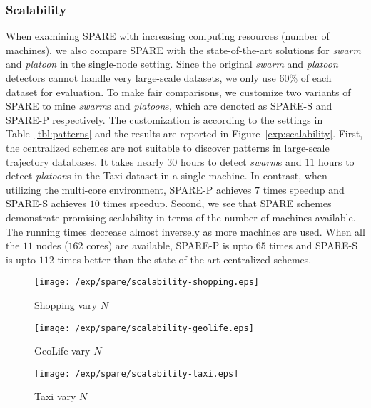 \subsubsection{Scalability}
When examining SPARE with increasing computing resources (number of machines), we also compare SPARE with the state-of-the-art solutions for \emph{swarm} and \emph{platoon} in the single-node setting. Since the original \emph{swarm} and \emph{platoon} detectors cannot handle very large-scale datasets, we only use 60\% of each dataset for evaluation. To make fair comparisons, we customize two variants of SPARE to mine \emph{swarm}s and \emph{platoon}s, which are denoted as SPARE-S and SPARE-P respectively. The customization is according to the settings in Table~\ref{tbl:patterns} and the results are reported in Figure~\ref{exp:scalability}. 
First, the centralized schemes are not suitable to discover patterns in 
large-scale trajectory databases. It takes nearly $30$ hours to 
detect \emph{swarm}s and $11$ hours to detect \emph{platoon}s in the Taxi dataset in a single machine. 
In contrast, when utilizing the multi-core  environment, 
SPARE-P achieves $7$ times speedup and SPARE-S achieves $10$ times speedup. 
Second, we see that SPARE schemes demonstrate promising scalability in terms of the number of machines available. The running times decrease almost inversely as more machines are used. 
When all the $11$ nodes ($162$ cores) are available, 
SPARE-P is upto $65$ times and SPARE-S is upto $112$ times better than the state-of-the-art centralized schemes.

\begin{figure*}[t]
\centering
\begin{subfigure}[b]{0.3\textwidth}
    \texttt{[image: /exp/spare/scalability-shopping.eps]}
        \caption{Shopping vary $N$}
    \end{subfigure}
 	 \begin{subfigure}[b]{0.3\textwidth}
        \texttt{[image: /exp/spare/scalability-geolife.eps]}
        \caption{GeoLife vary $N$}
    \end{subfigure}
    	 \begin{subfigure}[b]{0.3\textwidth}
        \texttt{[image: /exp/spare/scalability-taxi.eps]}
        \caption{Taxi vary $N$}
    \end{subfigure}
 \caption{Comparisons among TRMP, SPARE, PLATOON and SWARM.}
 \label{exp:scalability}
\end{figure*}
